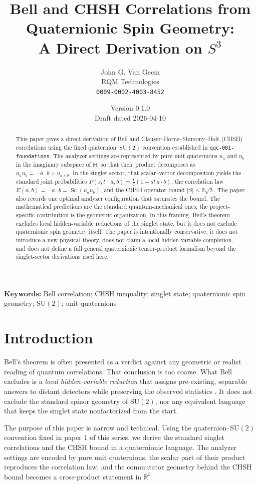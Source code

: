 \documentclass[11pt]{article}
\title{\textbf{Bell and CHSH Correlations from Quaternionic Spin Geometry:}\\ \textbf{A Direct Derivation on \texorpdfstring{$S^3$}{S3}}}
\author{John G. Van Geem\\RQM Technologies\\\texttt{0009-0002-4003-8452}}
\date{Version 0.1.0 \\ Draft dated 2026-04-10}
\theoremstyle{remark}
\newcommand{\R}{\mathbb{R}}
\newcommand{\HH}{\mathbb{H}}
\newcommand{\SU}{\mathrm{SU}}
\newcommand{\Sc}{\operatorname{Sc}}
\newcommand{\abs}[1]{\left\lvert #1 \right\rvert}
\begin{document}
\maketitle

\begin{abstract}
This paper gives a direct derivation of Bell and Clauser--Horne--Shimony--Holt (CHSH) correlations using the fixed quaternion--$\SU(2)$ convention established in \texttt{qqc-001-foundations}. The analyzer settings are represented by pure unit quaternions $u_a$ and $u_b$ in the imaginary subspace of $\HH$, so that their product decomposes as $u_a u_b = -a\cdot b + u_{a\times b}$. In the singlet sector, that scalar--vector decomposition yields the standard joint probabilities $P(s,t \mid a,b)=\frac14(1-st\,a\cdot b)$, the correlation law $E(a,b)=-a\cdot b=\Sc(u_a u_b)$, and the CHSH operator bound $\abs{S}\le 2\sqrt2$. The paper also records one optimal analyzer configuration that saturates the bound. The mathematical predictions are the standard quantum-mechanical ones; the project-specific contribution is the geometric organization. In this framing, Bell's theorem excludes local hidden-variable reductions of the singlet state, but it does not exclude quaternionic spin geometry itself. The paper is intentionally conservative: it does not introduce a new physical theory, does not claim a local hidden-variable completion, and does not define a full general quaternionic tensor-product formalism beyond the singlet-sector derivations used here.
\end{abstract}

\noindent\textbf{Keywords:} Bell correlation; CHSH inequality; singlet state; quaternionic spin geometry; $\SU(2)$; unit quaternions

\section{Introduction}

Bell's theorem is often presented as a verdict against any geometric or realist reading of quantum correlations. That conclusion is too coarse. What Bell excludes is a \emph{local hidden-variable reduction} that assigns pre-existing, separable answers to distant detectors while preserving the observed statistics \citep{bell1964,clauser1969}. It does not exclude the standard spinor geometry of $\SU(2)$, nor any equivalent language that keeps the singlet state nonfactorized from the start.

The purpose of this paper is narrow and technical. Using the quaternion--$\SU(2)$ convention fixed in paper 1 of this series, we derive the standard singlet correlations and the CHSH bound in a quaternionic language. The analyzer settings are encoded by pure unit quaternions, the scalar part of their product reproduces the correlation law, and the commutator geometry behind the CHSH bound becomes a cross-product statement in $\R^3$.
\end{document}
